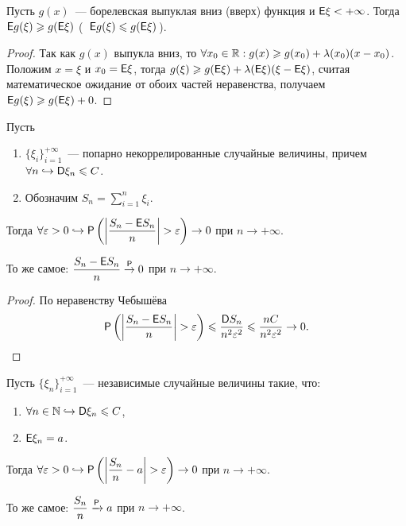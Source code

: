 \begin{lemma}
	Пусть $g(x)$~--- борелевская выпуклая вниз (вверх) функция и $\E \xi < +\infty$. 
	Тогда $\E g(\xi) \geqslant g(\E \xi )$ (~$\E g(\xi) \leqslant g(\E \xi )$\,).
	\begin{proof}
		Так как $g(x)$ выпукла вниз, то $\forall x_0 \in \R : g(x) \geqslant g(x_0) + \lambda(x_0)(x - x_0)$. Положим $x = \xi$ и $x_0 = \E \xi$, тогда $g(\xi) \geqslant g(\E \xi) + \lambda(\E \xi)(\xi - \E \xi)$, считая математическое ожидание от обоих частей неравенства, получаем $\E g(\xi) \geqslant g( \E \xi ) + 0$.
	\end{proof}
\end{lemma}


\begin{theorem}
	Пусть 
	\begin{enumerate}
	    \item $\{\xi_i\}_{i=1}^{+\infty}$~---  попарно некоррелированные случайные величины, причем $\forall n \hookrightarrow \D \xi_n \leqslant C$.
	    \item Обозначим $S_n = \sum\limits_{i=1}^n \xi_i$.
	\end{enumerate} 
	Тогда $\forall \varepsilon > 0 \hookrightarrow \P \left(\left| \dfrac{S_n - \E S_n}{n} \right| > \varepsilon\right) \rightarrow 0$ при $n \rightarrow +\infty$.
	
	То же самое: $\dfrac{S_n - \E S_n}{n} \overset{\P}{\rightarrow} 0$ при $n \rightarrow +\infty$\Big.
	\begin{proof}
		По неравенству Чебышёва 
		$$\P \left(\left| \dfrac{S_n - \E S_n}{n} \right| > \varepsilon\right) \leqslant \dfrac{\D S_n}{n^2 \varepsilon^2} \leqslant \dfrac{nC}{n^2\varepsilon^2} \rightarrow 0.$$ 
	\end{proof}
\end{theorem}

\begin{consequence}
	Пусть $\{ \xi_n \}_{i=1}^{+\infty}$~--- независимые случайные величины такие, что:
	\begin{enumerate}
	    \item $\forall n \in \N \hookrightarrow \D \xi_n \leqslant C$,
	    \item $\E \xi_n = a$.
	\end{enumerate} 
	 Тогда $\forall \varepsilon > 0 \hookrightarrow \P \left(\left| \dfrac{S_n}{n} - a \right| > \varepsilon\right) \rightarrow 0$ при $n \rightarrow +\infty$.	
		
	То же самое: $\dfrac{S_n}{n} \xrightarrow{\P} a$ при $n \rightarrow + \infty$. 
\end{consequence}


